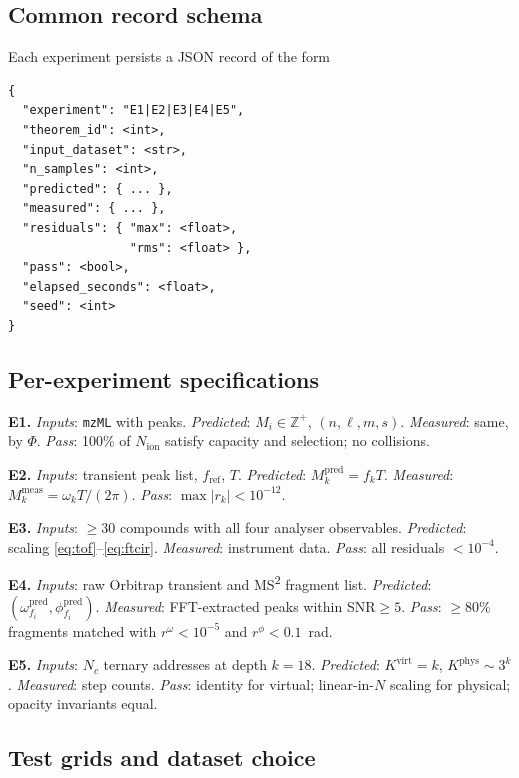 \documentclass[twocolumn,10pt,a4paper]{article}
\theoremstyle{thmstyle}
\theoremstyle{definition}
\theoremstyle{remark}
\newcommand{\Zp}{\mathbb{Z}^{+}}
\newcommand{\PhiMap}{\varPhi}
\begin{document}
\subsection{Common record schema}

Each experiment persists a JSON record of the form
\begin{verbatim}
{
  "experiment": "E1|E2|E3|E4|E5",
  "theorem_id": <int>,
  "input_dataset": <str>,
  "n_samples": <int>,
  "predicted": { ... },
  "measured": { ... },
  "residuals": { "max": <float>,
                 "rms": <float> },
  "pass": <bool>,
  "elapsed_seconds": <float>,
  "seed": <int>
}
\end{verbatim}

\subsection{Per-experiment specifications}

\textbf{E1.} \emph{Inputs}: \texttt{mzML} with peaks. \emph{Predicted}:
$M_{i}\in\Zp$, $(n,\ell,m,s)$. \emph{Measured}: same, by
$\PhiMap$. \emph{Pass}: 100\% of $N_{\mathrm{ion}}$ satisfy capacity
and selection; no collisions.

\textbf{E2.} \emph{Inputs}: transient peak list, $f_{\mathrm{ref}}$,
$T$. \emph{Predicted}: $M_{k}^{\mathrm{pred}}=f_{k}T$. \emph{Measured}:
$M_{k}^{\mathrm{meas}}=\omega_{k}T/(2\pi)$. \emph{Pass}:
$\max|r_{k}|<10^{-12}$.

\textbf{E3.} \emph{Inputs}: $\geq 30$ compounds with all four
analyser observables. \emph{Predicted}: scaling \eqref{eq:tof}--\eqref{eq:ftcir}.
\emph{Measured}: instrument data. \emph{Pass}: all residuals $<10^{-4}$.

\textbf{E4.} \emph{Inputs}: raw Orbitrap transient and MS\textsuperscript{2}
fragment list. \emph{Predicted}: $(\omega_{f_{i}}^{\mathrm{pred}},
\phi_{f_{i}}^{\mathrm{pred}})$. \emph{Measured}: FFT-extracted peaks
within SNR$\geq 5$. \emph{Pass}: $\geq 80\%$ fragments matched with
$r^{\omega}<10^{-5}$ and $r^{\phi}<0.1$~rad.

\textbf{E5.} \emph{Inputs}: $N_{c}$ ternary addresses at depth $k=18$.
\emph{Predicted}: $K^{\mathrm{virt}}=k$,
$K^{\mathrm{phys}}\sim 3^{k}$. \emph{Measured}: step counts.
\emph{Pass}: identity for virtual; linear-in-$N$ scaling for physical;
opacity invariants equal.

\subsection{Test grids and dataset choice}
\end{document}
